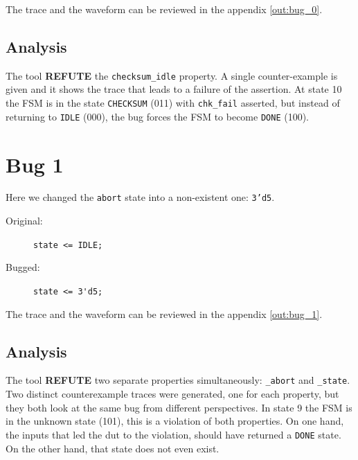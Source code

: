 The trace and the waveform can be reviewed in the appendix \ref{out:bug_0}.

\subsection*{Analysis}
The tool \textbf{REFUTE} the \texttt{checksum\_idle} property.
A single counter-example is given and it shows the trace that leads to a failure of the assertion. 
At state 10 the FSM is in the state \texttt{CHECKSUM} (011) with \texttt{chk\_fail} asserted, but instead of returning to \texttt{IDLE} (000), the bug forces the FSM to become \texttt{DONE} (100).

\section{Bug 1}
Here we changed the \texttt{abort} state into a non-existent one: \texttt{3'd5}.

\begin{description}
    \item[Original:] \lstinline[style=svlog]|state <= IDLE;|
    \item[Bugged:]   \lstinline[style=svlog]|state <= 3'd5;|
\end{description}

The trace and the waveform can be reviewed in the appendix \ref{out:bug_1}.

\subsection*{Analysis}
The tool \textbf{REFUTE} two separate properties simultaneously: \texttt{\_abort} and \texttt{\_state}.
Two distinct counterexample traces were generated, one for each property, but they both look at the same bug from different perspectives.
In state 9 the FSM is in the unknown state (101), this is a violation of both properties.
On one hand, the inputs that led the dut to the violation, should have returned a \texttt{DONE} state. 
On the other hand, that state does not even exist.
